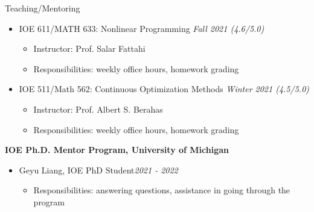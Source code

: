 \documentclass{resume}
\begin{document}
\begin{rSection}{Teaching/Mentoring}
\begin{itemize}
\begin{itemize}
            
              
        \end{itemize}
        \item IOE 611/MATH 633: Nonlinear Programming \hfill {\em Fall 2021 (4.6/5.0)}
        \begin{itemize}
            \item Instructor: Prof. Salar Fattahi
            \item Responsibilities: weekly office hours, homework grading
        \end{itemize}
        \item IOE 511/Math 562: Continuous Optimization Methods \hfill {\em Winter 2021 (4.5/5.0)}
        \begin{itemize}
            \item Instructor: Prof. Albert S. Berahas
            \item Responsibilities: weekly office hours, homework grading
        \end{itemize}
\end{itemize}
{\bf IOE Ph.D. Mentor Program, University of Michigan}
\begin{itemize}
    \item Geyu Liang, IOE PhD Student\hfill {\em 2021 - 2022}
    \begin{itemize}
      \item Responsibilities: answering questions, assistance in going through the program
  \end{itemize}
\end{itemize}

\end{rSection}
\end{document}
